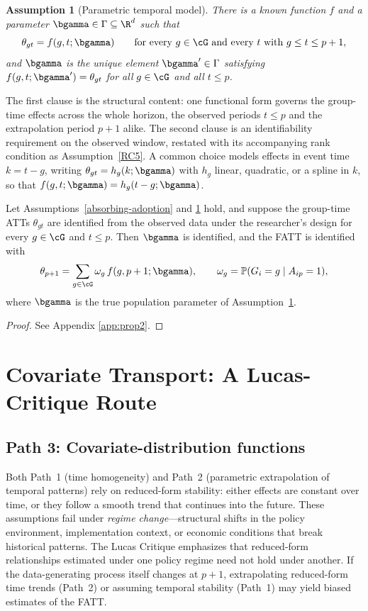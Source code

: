 \documentclass{article}
\newtheorem{assumption}{Assumption}
\renewcommand{\P}{\mathbb{P}}
\begin{document}
\begin{assumption}[Parametric temporal model]\label{assump:parametric}
There is a known function $f$ and a parameter $\bgamma \in \Gamma \subseteq \R^d$ such that
\[
\theta_{gt} = f(g,t;\bgamma) \qquad \text{for every } g \in \cG \text{ and every } t \text{ with } g \leq t \leq p+1,
\]
and $\bgamma$ is the unique element $\bgamma' \in \Gamma$ satisfying $f(g,t;\bgamma') = \theta_{gt}$ for all $g \in \cG$ and all $t \leq p$.
\end{assumption}

The first clause is the structural content: one functional form governs the group-time effects across the whole horizon, the observed periods $t \leq p$ and the extrapolation period $p+1$ alike. The second clause is an identifiability requirement on the observed window, restated with its accompanying rank condition as Assumption~\ref{RC5}. A common choice models effects in event time $k = t-g$, writing $\theta_{gt} = h_g(k;\bgamma)$ with $h_g$ linear, quadratic, or a spline in $k$, so that $f(g,t;\bgamma) = h_g(t-g;\bgamma)$.

\begin{proposition}\label{prop:path2}
Let Assumptions~\ref{absorbing-adoption} and \ref{assump:parametric} hold, and suppose the group-time ATTs $\theta_{gt}$ are identified from the observed data under the researcher's design for every $g \in \cG$ and $t \leq p$. Then $\bgamma$ is identified, and the FATT is identified with
\[
\theta_{p+1} = \sum_{g \in \cG} \omega_g\, f(g, p+1; \bgamma), \qquad \omega_g = \P(G_i = g \mid A_{ip}=1),
\]
where $\bgamma$ is the true population parameter of Assumption~\ref{assump:parametric}.
\end{proposition}

\begin{proof}
See Appendix \ref{app:prop2}.
\end{proof}

\section{Covariate Transport: A Lucas-Critique Route}\label{sec:covariate-transport}
\subsection{Path 3: Covariate-distribution functions}\label{sec:path3}

Both Path~1 (time homogeneity) and Path~2 (parametric extrapolation of temporal patterns) rely on reduced-form stability: either effects are constant over time, or they follow a smooth trend that continues into the future. These assumptions fail under \emph{regime change}---structural shifts in the policy environment, implementation context, or economic conditions that break historical patterns. The Lucas Critique \citep{lucasjrEconometricPolicyEvaluation1976} emphasizes that reduced-form relationships estimated under one policy regime need not hold under another. If the data-generating process itself changes at $p+1$, extrapolating reduced-form time trends (Path~2) or assuming temporal stability (Path~1) may yield biased estimates of the FATT.
\end{document}
